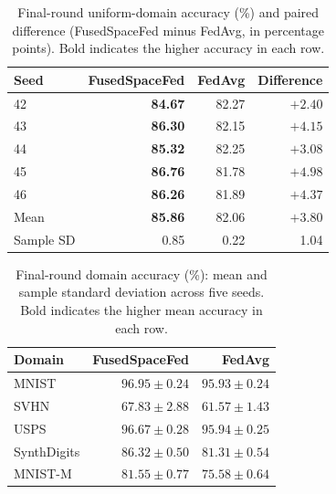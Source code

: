\begin{table}[H]
\coauthorcolor
\centering
\small
\setlength{\tabcolsep}{4pt}
\caption{Final-round uniform-domain accuracy (\%) and paired difference
(FusedSpaceFed minus FedAvg, in percentage points).
Bold indicates the higher accuracy in each row.}
\label{tab:capacity_compute_seeds}
\begin{tabular}{lrrr}
\toprule
Seed & FusedSpaceFed & FedAvg & Difference \\
\midrule
42 & \textbf{84.67} & 82.27 & $+2.40$ \\
43 & \textbf{86.30} & 82.15 & $+4.15$ \\
44 & \textbf{85.32} & 82.25 & $+3.08$ \\
45 & \textbf{86.76} & 81.78 & $+4.98$ \\
46 & \textbf{86.26} & 81.89 & $+4.37$ \\
\midrule
Mean & \textbf{85.86} & 82.06 & $+3.80$ \\
Sample SD & 0.85 & 0.22 & 1.04 \\
\bottomrule
\end{tabular}
\end{table}

\begin{table}[H]
\coauthorcolor
\centering
\small
\setlength{\tabcolsep}{4pt}
\caption{Final-round domain accuracy (\%): mean and sample standard
deviation across five seeds.
Bold indicates the higher mean accuracy in each row.}
\label{tab:capacity_compute_domains}
\begin{tabular}{lrr}
\toprule
Domain & FusedSpaceFed & FedAvg \\
\midrule
MNIST & $\boldsymbol{96.95\pm0.24}$ & $95.93\pm0.24$ \\
SVHN & $\boldsymbol{67.83\pm2.88}$ & $61.57\pm1.43$ \\
USPS & $\boldsymbol{96.67\pm0.28}$ & $95.94\pm0.25$ \\
SynthDigits & $\boldsymbol{86.32\pm0.50}$ & $81.31\pm0.54$ \\
MNIST-M & $\boldsymbol{81.55\pm0.77}$ & $75.58\pm0.64$ \\
\bottomrule
\end{tabular}
\end{table}

